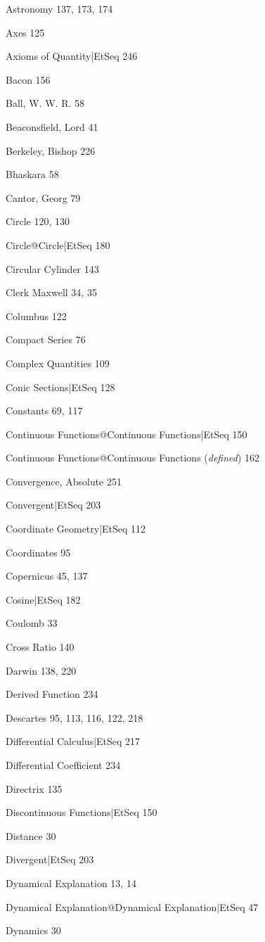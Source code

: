 \documentclass[12pt,leqno]{book}[2005/09/16]
\begin{document}
Astronomy 137, 173, 174

Axes 125

Axioms of Quantity|EtSeq 246

Bacon 156

Ball, W. W. R. 58

Beaconsfield, Lord 41

Berkeley, Bishop 226

Bhaskara 58

Cantor, Georg 79

Circle 120, 130

Circle@Circle|EtSeq 180

Circular Cylinder 143

Clerk Maxwell 34, 35

Columbus 122

Compact Series 76

Complex Quantities 109

Conic Sections|EtSeq 128

Constants 69, 117

Continuous Functions@Continuous Functions|EtSeq 150

Continuous Functions@Continuous Functions (\emph{defined}) 162

Convergence, Absolute 251

Convergent|EtSeq 203

Coordinate Geometry|EtSeq 112

Coordinates 95

Copernicus 45, 137

Cosine|EtSeq 182

Coulomb 33

Cross Ratio 140

Darwin 138, 220

Derived Function 234

Descartes 95, 113, 116, 122, 218

Differential Calculus|EtSeq 217

Differential Coefficient 234

Directrix 135

Discontinuous Functions|EtSeq 150

Distance 30

Divergent|EtSeq 203

Dynamical Explanation 13, 14

Dynamical Explanation@Dynamical Explanation|EtSeq 47

Dynamics 30
\end{document}
